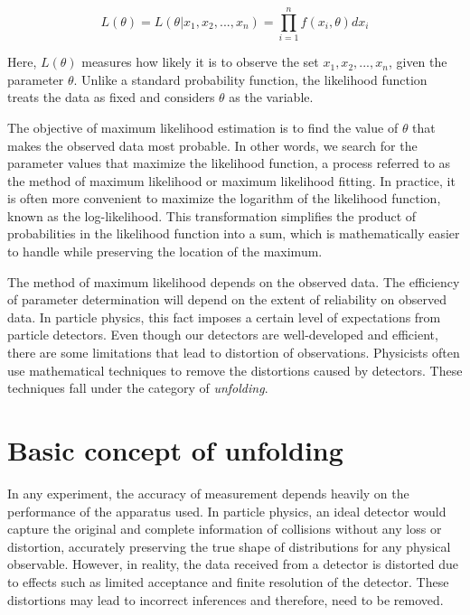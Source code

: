 \begin{equation}
    L (\theta) = L(\theta | x_1,x_2,...,x_n) = \prod_{i=1}^{n} f (x_i,\theta)dx_i
    \label{eqn:likeli}
\end{equation}


Here, $L(\theta)$ measures how likely it is to observe the set ${x_1,x_2,...,x_n}$, given the 
parameter $\theta$. Unlike a standard probability function, the likelihood function treats the 
data as fixed and considers $\theta$ as the variable.

The objective of maximum likelihood estimation is to find the value of 
$\theta$ that makes the observed data most probable. In other words, we search for the parameter 
values that maximize the likelihood function, a process referred to as the method of maximum 
likelihood or maximum likelihood fitting. In practice, it is often more convenient to maximize the 
logarithm of the likelihood function, known as the log-likelihood. This transformation simplifies the 
product of probabilities in the likelihood function into a sum, which is mathematically easier to 
handle while preserving the location of the maximum.

The method of maximum likelihood depends on the observed data. The efficiency of parameter determination
will depend on the extent of reliability on observed data. In particle physics, this fact imposes a 
certain level of expectations from particle detectors. Even though our detectors are well-developed
and efficient, there are some limitations that lead to distortion of observations. Physicists often use
mathematical techniques to remove the distortions caused by detectors. These techniques fall under the
category of \textit{unfolding}.  

\section{Basic concept of unfolding}

In any experiment, the accuracy of measurement depends heavily on the performance of the apparatus 
used. In particle physics, an ideal detector would capture the original and complete information 
of collisions without any loss or distortion, accurately preserving the true shape
of distributions for any physical observable. However, in reality, the data received 
from a detector is distorted due to effects such as limited acceptance and 
finite resolution of the detector. These distortions may lead to incorrect inferences and
therefore, need to be removed.

